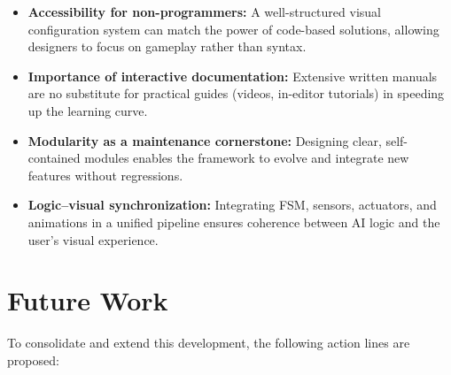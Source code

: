\begin{itemize}
  \item \textbf{Accessibility for non-programmers:} A well-structured visual configuration system can match the power of code-based solutions, allowing designers to focus on gameplay rather than syntax.
  \item \textbf{Importance of interactive documentation:} Extensive written manuals are no substitute for practical guides (videos, in-editor tutorials) in speeding up the learning curve.
  \item \textbf{Modularity as a maintenance cornerstone:} Designing clear, self-contained modules enables the framework to evolve and integrate new features without regressions.
  \item \textbf{Logic–visual synchronization:} Integrating FSM, sensors, actuators, and animations in a unified pipeline ensures coherence between AI logic and the user’s visual experience.
\end{itemize}

\section{Future Work}

To consolidate and extend this development, the following action lines are proposed:

